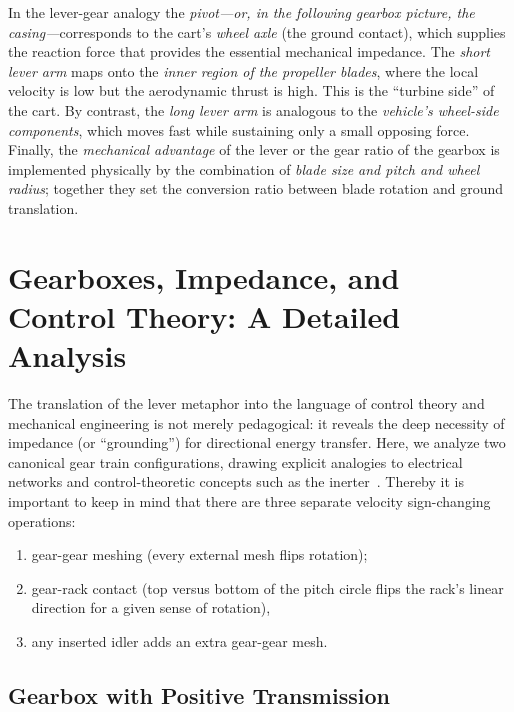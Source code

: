 \documentclass[reprint,aps,pra,superscriptaddress,longbibliography]{revtex4-2}
\begin{document}
In the lever-gear analogy the \emph{pivot---or, in the following gearbox picture, the
casing---}corresponds to the cart's \emph{wheel axle} (the ground contact),
which supplies the reaction force that provides the essential mechanical
impedance.  The \emph{short lever arm} maps onto the \emph{inner region of the
propeller blades}, where the local velocity is low but the aerodynamic thrust
is high. This is the ``turbine side'' of the cart.  By contrast, the
\emph{long lever arm} is analogous to the \emph{vehicle's wheel-side components},
which moves fast while sustaining only a small opposing force.  Finally, the
\emph{mechanical advantage} of the lever or the gear ratio of the gearbox is
implemented physically by the combination of \emph{blade size and pitch and wheel
radius}; together they set the conversion ratio between blade rotation and
ground translation.

\section{Gearboxes, Impedance, and Control Theory: A Detailed Analysis}

The translation of the lever metaphor into the language of control theory and mechanical engineering is not merely pedagogical: it reveals the deep necessity of impedance (or ``grounding'') for directional energy transfer. Here, we analyze two canonical gear train configurations, drawing explicit analogies to electrical networks and control-theoretic concepts such as the inerter~\cite{Smith2002}.
Thereby it is important to keep in mind that there are three separate velocity sign-changing operations:
\begin{enumerate}
\item gear-gear meshing (every external mesh flips rotation);
\item gear-rack contact (top versus bottom of the pitch circle flips the rack's linear direction for a given sense of rotation),
\item any inserted idler adds an extra gear-gear mesh.
\end{enumerate}



\subsection{Gearbox with Positive Transmission}
\end{document}
